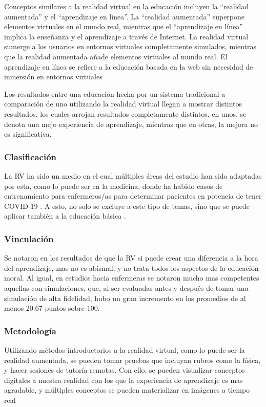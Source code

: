 Conceptos similares a la realidad virtual en la educación incluyen la “realidad aumentada” y el “aprendizaje en línea”. La “realidad aumentada” superpone elementos virtuales en el mundo real, mientras que el “aprendizaje en línea” implica la enseñanza y el aprendizaje a través de Internet. La realidad virtual sumerge a los usuarios en entornos virtuales completamente simulados, mientras que la realidad aumentada añade elementos virtuales al mundo real. El aprendizaje en línea se refiere a la educación basada en la web sin necesidad de inmersión en entornos virtuales \parencite{garcia2020}

Los resultados entre una educacion hecha por un sistema tradicional a comparaci{\'o}n de uno utilizando la realidad virtual llegan a mostrar distintos resultados, los cuales arrojan resultados completamente distintos, en unos, se denota una mejo experiencia de aprendizaje, mientras que en otras, la mejora no es significativa. \parencite{palma2020realidad, SHIM2023100010, GUERRERO2022100002}

\subsubsection{Clasificación}

La RV ha sido un medio en el cual múltiples áreas del estudio han sido adaptadas por esta, como lo puede ser en la medicina, donde ha habido casos de entrenamiento para enfermeros/as para determinar pacientes en potencia de tener COVID-19 \parencite{GUERRERO2022100002}. A esto, no solo se excluye a este tipo de temas, sino que se puede aplicar tambi{\'e}n a la educaci{\'o}n b{\'a}sica \parencite{marin2022realidad}.

\subsubsection{Vinculación}

Se notaron en los resultados de \textcite{SHIM2023100010} que la RV si puede crear una diferencia a la hora del aprendizaje, mas no es abismal, y no trata todos los aspectos de la educación moral. Al igual, en estudios hacia enfermeras se notaron mucho mas competentes aquellas con simulaciones, que, al ser evaluadas antes y después de tomar una simulación de alta fidelidad, hubo un gran incremento en los promedios de al menos 20.67 puntos sobre 100. \parencite{GUERRERO2022100002}

\subsubsection{Metodología}
Utilizando métodos introductorios a la realidad virtual, como lo puede ser la realidad aumentada, se pueden tomar pruebas que incluyan rubros como la física, y hacer sesiones de tutoría remotas. Con ello, se pueden visualizar conceptos digitales a nuestra realidad con los que la experiencia de aprendizaje es mas agradable, y múltiples conceptos se pueden materializar en imágenes a tiempo real \parencite{RADU2023100011}



